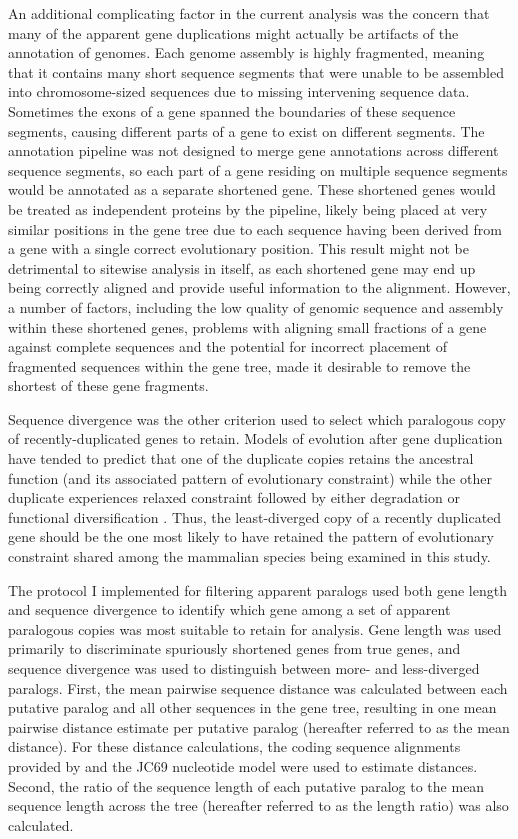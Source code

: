 An additional complicating factor in the current analysis was the
concern that many of the apparent gene duplications might actually be
artifacts of the annotation of \lcv genomes. Each \lcv genome assembly
is highly fragmented, meaning that it contains many short sequence
segments that were unable to be assembled into chromosome-sized
sequences due to missing intervening sequence data. Sometimes the
exons of a gene spanned the boundaries of these sequence segments,
causing different parts of a gene to exist on different segments. The
\ens annotation pipeline was not designed to merge gene annotations
across different sequence segments, so each part of a gene residing on
multiple sequence segments would be annotated as a separate shortened
gene. These shortened genes would be treated as independent proteins
by the \cmp pipeline, likely being placed at very similar positions in
the gene tree due to each sequence having been derived from a gene
with a single correct evolutionary position. This result might not be
detrimental to sitewise analysis in itself, as each shortened gene may
end up being correctly aligned and provide useful information to the
alignment. However, a number of factors, including the low quality of
genomic sequence and assembly within these shortened genes, problems
with aligning small fractions of a gene against complete sequences and
the potential for incorrect placement of fragmented sequences within
the gene tree, made it desirable to remove the shortest of these gene
fragments.

Sequence divergence was the other criterion used to select which
paralogous copy of recently-duplicated genes to retain. Models of
evolution after gene duplication have tended to predict that one of the
duplicate copies retains the ancestral function (and its associated
pattern of evolutionary constraint) while the other duplicate
experiences relaxed constraint followed by either degradation or
functional diversification \citep{Han2009}. Thus, the least-diverged
copy of a recently duplicated gene should be the one most likely to
have retained the pattern of evolutionary constraint shared among the
mammalian species being examined in this study.

The protocol I implemented for filtering apparent paralogs used both
gene length and sequence divergence to identify which gene among a set
of apparent paralogous copies was most suitable to retain for
analysis. Gene length was used primarily to discriminate spuriously
shortened genes from true genes, and sequence divergence was used to
distinguish between more- and less-diverged paralogs. First, the mean
pairwise sequence distance was calculated between each putative
paralog and all other sequences in the gene tree, resulting in one
mean pairwise distance estimate per putative paralog (hereafter
referred to as the mean distance). For these distance calculations,
the coding sequence alignments provided by \ens \cmp and the JC69
nucleotide model were used to estimate distances. Second, the ratio of
the sequence length of each putative paralog to the mean sequence
length across the tree (hereafter referred to as the length ratio) was
also calculated.

